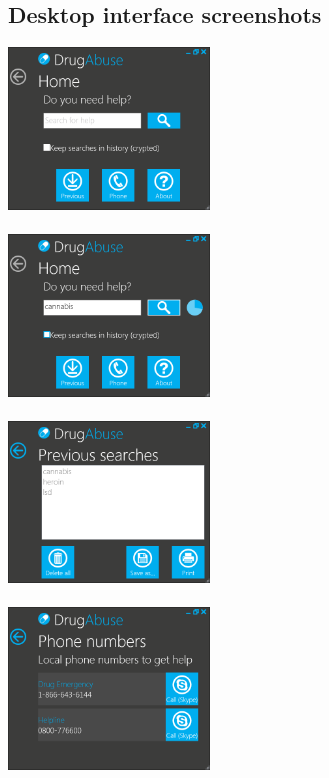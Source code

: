 \documentclass[a4paper,12pt, twocolumn]{article}
\begin{document}

\subsection{Desktop interface screenshots}

\begin{center}
\includegraphics[width=0.4\textwidth]{images/desktop_screen_home.png}
\label{desktop_home}
~\\~\\

\includegraphics[width=0.4\textwidth]{images/desktop_screen_home_dl.png}
\label{desktop_dl}
~\\~\\

\includegraphics[width=0.4\textwidth]{images/desktop_screen_previous.png}
\label{desktop_previous}
~\\~\\

\includegraphics[width=0.4\textwidth]{images/desktop_screen_phone.png}
\label{desktop_phone}
~\\~\\


\end{center}
\end{document}

